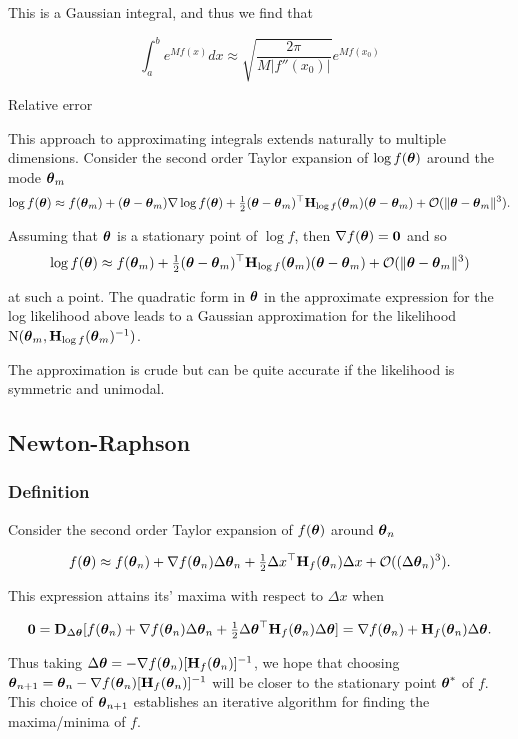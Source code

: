 \documentclass{amsart}[12pt]
\begin{document}
This is a Gaussian integral, and thus we find that

\[
	\int_a^b e^{M f(x)} dx \approx \sqrt{\frac{2 \pi}{M |f''(x_0)|}} e^{M f(x_0)}
\]

Relative error


This approach to approximating integrals extends naturally to multiple dimensions.
Consider the second order Taylor expansion of $\log f({\boldsymbol \theta})$ around the mode ${\boldsymbol \theta}_m$
$$
\log f({\boldsymbol \theta}) \approx f({\boldsymbol \theta}_m) + ({\boldsymbol \theta} - {\boldsymbol \theta}_m) \nabla \log f({\boldsymbol \theta}) + \tfrac{1}{2} ({\boldsymbol \theta} - {\boldsymbol \theta}_m)^\top {\bf H}_{\log f}({\boldsymbol \theta}_m) ({\boldsymbol \theta} - {\boldsymbol \theta}_m) + {\mathcal O}(\|{\boldsymbol \theta} - {\boldsymbol \theta}_m\|^3).
$$

Assuming that ${\boldsymbol \theta}$ is a stationary point of $\log f$, then $\nabla f({\boldsymbol \theta}) = {\bf 0}$ and so
$$
\log f({\boldsymbol \theta}) \approx f({\boldsymbol \theta}_m) + \tfrac{1}{2} ({\boldsymbol \theta} - {\boldsymbol \theta}_m)^\top {\bf H}_{\log f}({\boldsymbol \theta}_m) ({\boldsymbol \theta} - {\boldsymbol \theta}_m) + {\mathcal O}(\|{\boldsymbol \theta} - {\boldsymbol \theta}_m\|^3)
$$

at such a point. The quadratic form in ${\boldsymbol \theta}$ in the approximate expression for the log likelihood above
leads to a Gaussian approximation for the likelihood $\text{N}({\boldsymbol \theta}_m, {\bf H}_{\log f}({\boldsymbol \theta}_m)^{-1})$.

The approximation is crude but can be quite accurate if the likelihood is symmetric and unimodal.

\subsection{Newton-Raphson}

\subsubsection{Definition}

Consider the second order Taylor expansion of $f({\boldsymbol \theta})$ around ${\boldsymbol \theta}_{n}$

$$
f({\boldsymbol \theta}) \approx f({\boldsymbol \theta}_{n}) + \nabla f({\boldsymbol \theta}_{n}) \Delta {\boldsymbol\theta}_{n} + \tfrac{1}{2} \Delta x^\top {\bf H}_f({\boldsymbol \theta}_{n}) \Delta x + {\mathcal O}((\Delta {\boldsymbol\theta}_{n})^3).
$$

This expression attains its' maxima with respect to $\Delta x$ when

$$
{\bf 0} = {\bf D}_{\Delta {\boldsymbol\theta}} [f({\boldsymbol \theta}_{n}) + \nabla f({\boldsymbol \theta}_{n}) \Delta {\boldsymbol\theta}_{n} + \tfrac{1}{2} \Delta {\boldsymbol\theta}^\top {\bf H}_f({\boldsymbol \theta}_{n}) \Delta {\boldsymbol\theta}] = \nabla f({\boldsymbol \theta}_n) + {\bf H}_f({\boldsymbol \theta}_n) \Delta {\boldsymbol\theta}.
$$

Thus taking $\Delta {\boldsymbol\theta} = -\nabla f({\boldsymbol \theta}_n) [{\bf H}_f({\boldsymbol \theta}_n)]^{-1}$, we hope that choosing
${\boldsymbol \theta}_{n + 1} = {\boldsymbol \theta}_{n} - \nabla f({\boldsymbol \theta}_n) [{\bf H}_f({\boldsymbol \theta}_n)]^{-1}$ will be closer to the stationary 
point ${\boldsymbol \theta}^*$ of $f$. This choice of ${\boldsymbol \theta}_{n+1}$ establishes an iterative algorithm for finding the 
maxima/minima of $f$.
\end{document}
